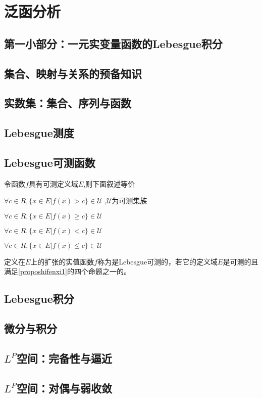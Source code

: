 \documentclass[12pt, a4paper, oneside, UTF8]{ctexbook}
\begin{document}
\else
\fi

\chapter{泛函分析}
\section*{第一小部分：一元实变量函数的Lebesgue积分}
\section*{集合、映射与关系的预备知识}

\section{实数集：集合、序列与函数}

\section{Lebesgue测度}


\section{Lebesgue可测函数}
\begin{proposition}
	令函数$f$具有可测定义域$E$,则下面叙述等价
	\begin{change}
		\item $\forall c \in R,\{x\in E| f(x)>c\} \in \mathscr{U}$ ,$\mathscr{U}$为可测集族  
		\item $\forall c \in R,\{x\in E| f(x)\geqslant c\} \in \mathscr{U}$
		\item $\forall c \in R,\{x\in E| f(x)<c\} \in \mathscr{U}$
		\item $\forall c \in R,\{x\in E| f(x)\leqslant  c\} \in \mathscr{U}$
	\end{change}
\end{proposition}

\begin{defn}
	定义在$E$上的扩张的实值函数$f$称为是Lebesgue可测的，若它的定义域$E$是可测的且满足\cref{proposhifenxi1}的四个命题之一的。
\end{defn}
\section{Lebesgue积分}



\section{微分与积分}

\section{$L^P$空间：完备性与逼近}



\section{$L^P$空间：对偶与弱收敛}

\ifx\allfiles\undefined
\end{document}
